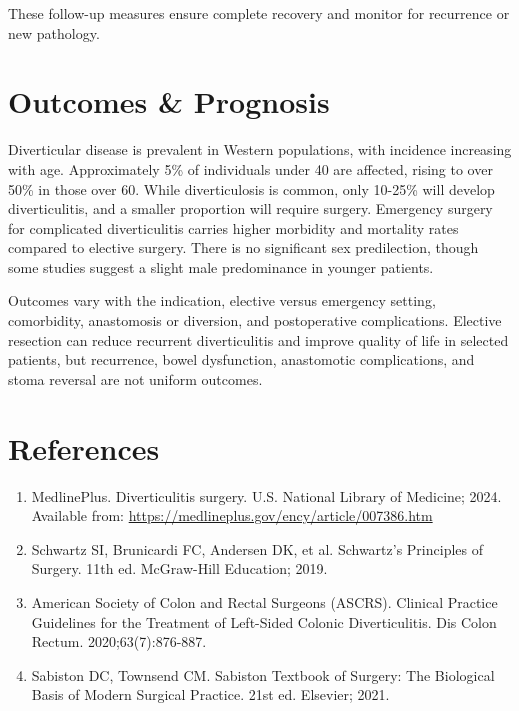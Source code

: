 These follow-up measures ensure complete recovery and monitor for recurrence or new pathology.

\section*{Outcomes \& Prognosis}
Diverticular disease is prevalent in Western populations, with incidence increasing with age. Approximately 5\% of individuals under 40 are affected, rising to over 50\% in those over 60. While diverticulosis is common, only 10-25\% will develop diverticulitis, and a smaller proportion will require surgery. Emergency surgery for complicated diverticulitis carries higher morbidity and mortality rates compared to elective surgery. There is no significant sex predilection, though some studies suggest a slight male predominance in younger patients.

Outcomes vary with the indication, elective versus emergency setting, comorbidity, anastomosis or diversion, and postoperative complications. Elective resection can reduce recurrent diverticulitis and improve quality of life in selected patients, but recurrence, bowel dysfunction, anastomotic complications, and stoma reversal are not uniform outcomes.

\section*{References}
\begin{enumerate}
  \item MedlinePlus. Diverticulitis surgery. U.S. National Library of Medicine; 2024. Available from: \url{https://medlineplus.gov/ency/article/007386.htm}
  
  \item Schwartz SI, Brunicardi FC, Andersen DK, et al. Schwartz's Principles of Surgery. 11th ed. McGraw-Hill Education; 2019.
  
  \item American Society of Colon and Rectal Surgeons (ASCRS). Clinical Practice Guidelines for the Treatment of Left-Sided Colonic Diverticulitis. Dis Colon Rectum. 2020;63(7):876-887.
  
  \item Sabiston DC, Townsend CM. Sabiston Textbook of Surgery: The Biological Basis of Modern Surgical Practice. 21st ed. Elsevier; 2021.
\end{enumerate}

\clearpage
